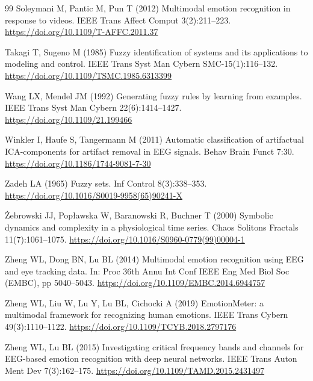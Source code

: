 \documentclass[11pt,a4paper]{article}
\begin{document}
\begin{thebibliography}{99}
 Soleymani M, Pantic M, Pun T (2012) Multimodal emotion recognition in response to videos. IEEE Trans Affect Comput 3(2):211--223. \url{https://doi.org/10.1109/T-AFFC.2011.37}

 Takagi T, Sugeno M (1985) Fuzzy identification of systems and its applications to modeling and control. IEEE Trans Syst Man Cybern SMC-15(1):116--132. \url{https://doi.org/10.1109/TSMC.1985.6313399}

 Wang LX, Mendel JM (1992) Generating fuzzy rules by learning from examples. IEEE Trans Syst Man Cybern 22(6):1414--1427. \url{https://doi.org/10.1109/21.199466}

 Winkler I, Haufe S, Tangermann M (2011) Automatic classification of artifactual ICA-components for artifact removal in EEG signals. Behav Brain Funct 7:30. \url{https://doi.org/10.1186/1744-9081-7-30}

 Zadeh LA (1965) Fuzzy sets. Inf Control 8(3):338--353. \url{https://doi.org/10.1016/S0019-9958(65)90241-X}

 \.Zebrowski JJ, Pop\l awska W, Baranowski R, Buchner T (2000) Symbolic dynamics and complexity in a physiological time series. Chaos Solitons Fractals 11(7):1061--1075. \url{https://doi.org/10.1016/S0960-0779(99)00004-1}

 Zheng WL, Dong BN, Lu BL (2014) Multimodal emotion recognition using EEG and eye tracking data. In: Proc 36th Annu Int Conf IEEE Eng Med Biol Soc (EMBC), pp 5040--5043. \url{https://doi.org/10.1109/EMBC.2014.6944757}

 Zheng WL, Liu W, Lu Y, Lu BL, Cichocki A (2019) EmotionMeter: a multimodal framework for recognizing human emotions. IEEE Trans Cybern 49(3):1110--1122. \url{https://doi.org/10.1109/TCYB.2018.2797176}

 Zheng WL, Lu BL (2015) Investigating critical frequency bands and channels for EEG-based emotion recognition with deep neural networks. IEEE Trans Auton Ment Dev 7(3):162--175. \url{https://doi.org/10.1109/TAMD.2015.2431497}

\end{thebibliography}
\end{document}
